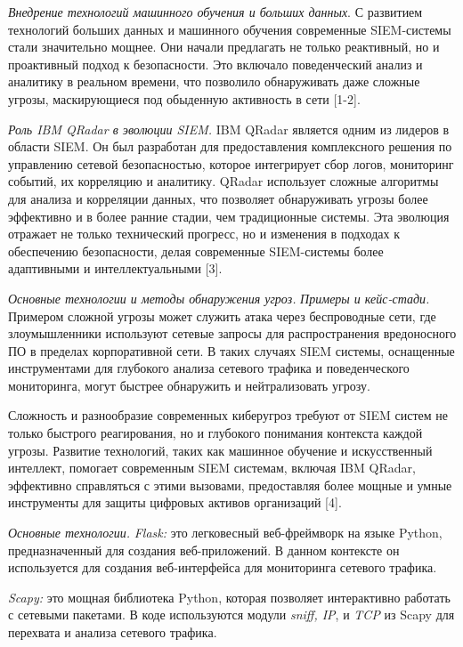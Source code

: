 \emph{Внедрение технологий машинного обучения и больших данных}. С
развитием технологий больших данных и машинного обучения современные
SIEM-системы стали значительно мощнее. Они начали предлагать не только
реактивный, но и проактивный подход к безопасности. Это включало
поведенческий анализ и аналитику в реальном времени, что позволило
обнаруживать даже сложные угрозы, маскирующиеся под обыденную активность
в сети {[}1-2{]}.

\emph{Роль IBM QRadar в эволюции SIEM.} IBM QRadar является одним из
лидеров в области SIEM. Он был разработан для предоставления
комплексного решения по управлению сетевой безопасностью, которое
интегрирует сбор логов, мониторинг событий, их корреляцию и аналитику.
QRadar использует сложные алгоритмы для анализа и корреляции данных, что
позволяет обнаруживать угрозы более эффективно и в более ранние стадии,
чем традиционные системы. Эта эволюция отражает не только технический
прогресс, но и изменения в подходах к обеспечению безопасности, делая
современные SIEM-системы более адаптивными и интеллектуальными {[}3{]}.

\emph{Основные технологии и методы обнаружения угроз.} \emph{Примеры и
кейс-стади.} Примером сложной угрозы может служить атака через
беспроводные сети, где злоумышленники используют сетевые запросы для
распространения вредоносного ПО в пределах корпоративной сети. В таких
случаях SIEM системы, оснащенные инструментами для глубокого анализа
сетевого трафика и поведенческого мониторинга, могут быстрее обнаружить
и нейтрализовать угрозу.

Сложность и разнообразие современных киберугроз требуют от SIEM систем
не только быстрого реагирования, но и глубокого понимания контекста
каждой угрозы. Развитие технологий, таких как машинное обучение и
искусственный интеллект, помогает современным SIEM системам, включая IBM
QRadar, эффективно справляться с этими вызовами, предоставляя более
мощные и умные инструменты для защиты цифровых активов организаций
{[}4{]}.

\emph{Основные технологии.} \emph{Flask:} это легковесный веб-фреймворк
на языке Python, предназначенный для создания веб-приложений. В данном
контексте он используется для создания веб-интерфейса для мониторинга
сетевого трафика.

\emph{Scapy:} это мощная библиотека Python, которая позволяет
интерактивно работать с сетевыми пакетами. В коде используются модули
\emph{sniff, IP}, и \emph{TCP} из Scapy для перехвата и анализа сетевого
трафика.

